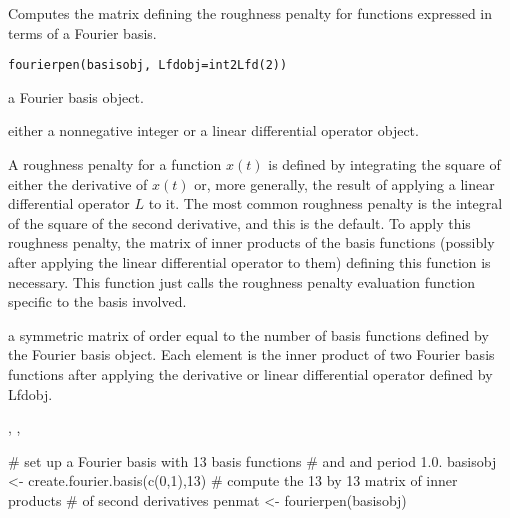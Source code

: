 \begin{Description}\relax
Computes the matrix defining the roughness penalty for functions
expressed in terms of a Fourier basis.
\end{Description}
\begin{Usage}
\begin{verbatim}
fourierpen(basisobj, Lfdobj=int2Lfd(2))
\end{verbatim}
\end{Usage}
\begin{Arguments}
\begin{ldescription}
\item[\code{basisobj}] a Fourier basis object.

\item[\code{Lfdobj}] either a nonnegative integer or a linear differential operator object.

\end{ldescription}
\end{Arguments}
\begin{Details}\relax
A roughness penalty for a function $x(t)$ is defined by
integrating the square of either the derivative of  $ x(t) $ or,
more generally, the result of applying a linear differential operator
$L$ to it.  The most common roughness penalty is the integral of
the square of the second derivative, and
this is the default. To apply this roughness penalty, the matrix of
inner products of the basis functions (possibly after applying the
linear differential operator to them) defining this function
is necessary. This function just calls the roughness penalty evaluation
function specific to the basis involved.
\end{Details}
\begin{Value}
a symmetric matrix of order equal to the number of basis functions
defined by the Fourier basis object.  Each element is the inner product
of two Fourier basis functions after applying the derivative or linear
differential operator defined by Lfdobj.
\end{Value}
\begin{SeeAlso}\relax
{}, 
, 
\end{SeeAlso}
\begin{Examples}
\begin{ExampleCode}

#  set up a Fourier basis with 13 basis functions
#  and and period 1.0.
basisobj <- create.fourier.basis(c(0,1),13)
#  compute the 13 by 13 matrix of inner products
#  of second derivatives
penmat <- fourierpen(basisobj)

\end{ExampleCode}
\end{Examples}


